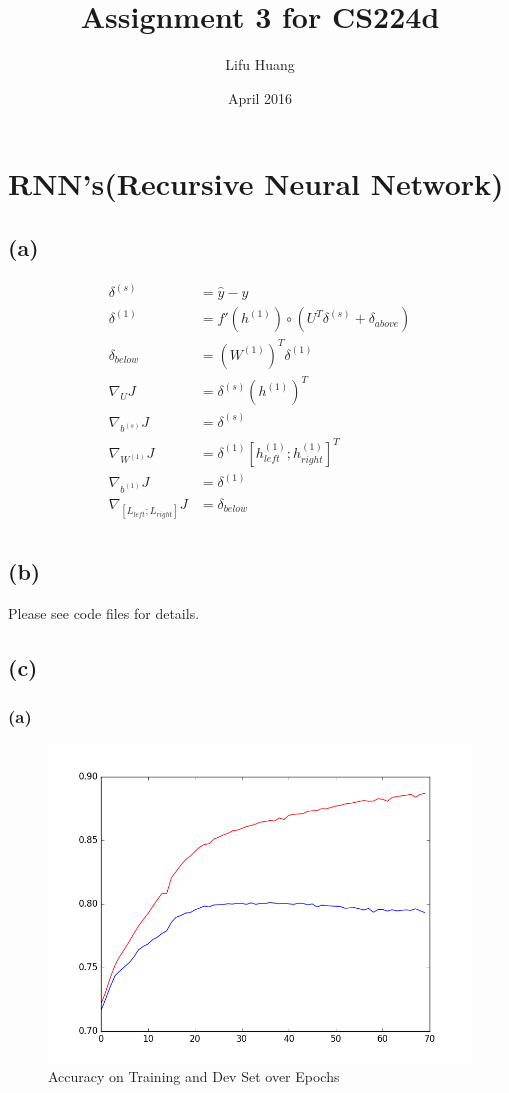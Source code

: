 \documentclass {article}
\title{Assignment 3 for CS224d}
\author{Lifu Huang}
\date{April 2016}
\begin{document}
\maketitle
\section{RNN's(Recursive Neural Network)}
\subsection*{(a)}
\begin{align*}
\delta^{(s)} &= \hat{y} - y \\
\delta^{(1)} &= f'(h^{(1)}) \circ (U^T \delta^{(s)} + \delta_{above}) \\
\delta_{below} &= (W^{(1)})^T \delta^{(1)}
\\
\nabla_U J &= \delta^{(s)} (h^{(1)})^T \\
\nabla_{b^{(s)}} J &= \delta^{(s)} \\
\nabla_{W^{(1)}} J &= \delta^{(1)} \left[h^{(1)}_{left}; h^{(1)}_{right}\right]^T \\
\nabla_{b^{(1)}} J &= \delta^{(1)} \\
\nabla_{\left[L_{left};L_{right} \right]} J &= \delta_{below} \\
\end{align*}
\subsection*{(b)}
Please see code files for details.
\subsection*{(c)}
\subsubsection*{(a)}
\begin{figure}[H]
\centering
\includegraphics[width=0.7\linewidth]{ps3_1_c_a}
\caption{Accuracy on Training and Dev Set over Epochs}
\label{fig:ps3_1_c_a}
\end{figure}
\end{document}
